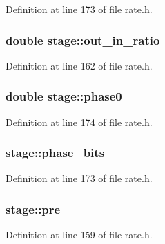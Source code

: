Definition at line 173 of file rate.\+h.

\subsubsection[{\texorpdfstring{out\+\_\+in\+\_\+ratio}{out_in_ratio}}]{\setlength{\rightskip}{0pt plus 5cm}double stage\+::out\+\_\+in\+\_\+ratio}\hypertarget{structstage_a7f6ab977daaec780e4788323fd32503b}{}\label{structstage_a7f6ab977daaec780e4788323fd32503b}


Definition at line 162 of file rate.\+h.

\subsubsection[{\texorpdfstring{phase0}{phase0}}]{\setlength{\rightskip}{0pt plus 5cm}double stage\+::phase0}\hypertarget{structstage_a1422b852a194f9e781d662656d60f37c}{}\label{structstage_a1422b852a194f9e781d662656d60f37c}


Definition at line 174 of file rate.\+h.

\subsubsection[{\texorpdfstring{phase\+\_\+bits}{phase_bits}}]{ stage\+::phase\+\_\+bits}\hypertarget{structstage_af0ad7a7e28b00424a27021aa6809f962}{}\label{structstage_af0ad7a7e28b00424a27021aa6809f962}


Definition at line 173 of file rate.\+h.

\subsubsection[{\texorpdfstring{pre}{pre}}]{ stage\+::pre}\hypertarget{structstage_a6ed0d8c8c6b9ac194988a2597118f0c2}{}\label{structstage_a6ed0d8c8c6b9ac194988a2597118f0c2}


Definition at line 159 of file rate.\+h.

